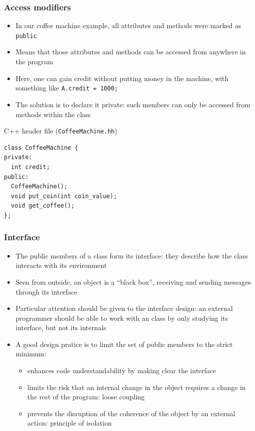\documentclass{beamer}
\begin{document}
\begin{frame}[fragile]
  \frametitle{Access modifiers}
  \begin{itemize}
  \item In our coffee machine example, all attributes and methods were marked as \texttt{public}
  \item Means that those attributes and methods can be accessed from anywhere in the program
  \item Here, one can gain credit without putting money in the machine, with something like \texttt{A.credit = 1000;}
  \item The solution is to declare it \alert{private}: such members can only be accessed from methods within the class
  \end{itemize}
  \begin{block}{C++ header file (\texttt{CoffeeMachine.hh})}
    \begin{scriptsize}
\begin{verbatim}
class CoffeeMachine {
private:
  int credit;
public:
  CoffeeMachine();
  void put_coin(int coin_value);
  void get_coffee();
};
\end{verbatim}
      \end{scriptsize}
  \end{block}
\end{frame}

\begin{frame}
  \frametitle{Interface}
  \begin{itemize}
  \item The public members of a class form its \alert{interface}: they describe how the class interacts with its environment
  \item Seen from outside, an object is a ``black box'', receiving and sending messages through its interface
  \item Particular attention should be given to the interface design: an external programmer should be able to work with an class by only studying its interface, but not its internals
  \item A good design pratice is to limit the set of public members to the strict minimum:
    \begin{itemize}
    \item enhances code understandability by making clear the interface
    \item limits the risk that an internal change in the object requires a change in the rest of the program: \alert{loose coupling}
    \item prevents the disruption of the coherence of the object by an external action: principle of \alert{isolation}
    \end{itemize}
  \end{itemize}
\end{frame}
\end{document}
